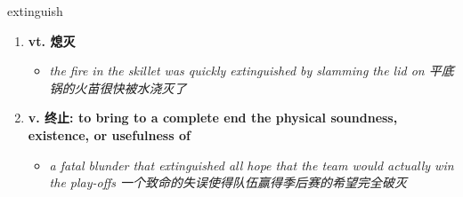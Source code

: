 
\begin{frame}
{\huge extinguish}
\begin{center}
\begin{enumerate}\Large
  \item \textbf{vt. 熄灭}
  \begin{itemize}
    \item \em{\Large{the fire in the skillet was quickly extinguished by slamming the lid on 平底锅的火苗很快被水浇灭了}}
  \end{itemize}
  \item \textbf{v. 终止: to bring to a complete end the physical soundness, existence, or usefulness of}
  \begin{itemize}
    \item \em{\Large{a fatal blunder that extinguished all hope that the team would actually win the play-offs 一个致命的失误使得队伍赢得季后赛的希望完全破灭}}
  \end{itemize}
\end{enumerate}
\end{center}
\end{frame}
